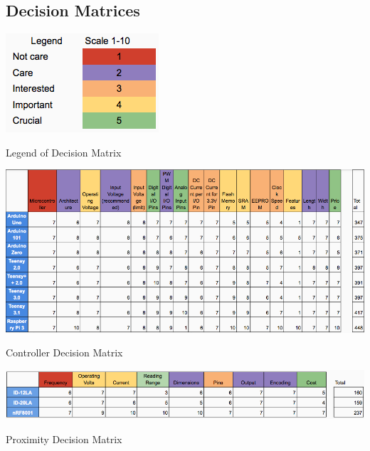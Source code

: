 \documentclass[12pt]{article}
\begin{document}
\newpage

{}

\newpage
\begin{appendix}

\section{Decision Matrices} \label{App:DecisionMatrices}

  \begin{table}[!htb]
    \begin{center}
      \includegraphics[scale=1]{Figures/DecisionMatrixLegend}
    \end{center}
    \caption{Legend of Decision Matrix}
    \label{tabl:DecLegend}
  \end{table}

  \begin{table}[!htb]
    \includegraphics[width=\textwidth]{Figures/DecisionMatrixController}
    \caption{Controller Decision Matrix}
     \label{tabl:DecController}
  \end{table}

  \begin{table}[!htb]
    \includegraphics[width=\textwidth]{Figures/DecisionMatrixProximity}
    \caption{Proximity Decision Matrix}
     \label{tabl:DecProximity}
  \end{table}


\end{appendix}
\end{document}
